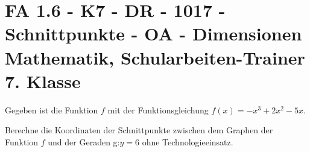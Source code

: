 \section{FA 1.6 - K7 - DR - 1017 - Schnittpunkte - OA - Dimensionen Mathematik, Schularbeiten-Trainer 7. Klasse}

\begin{beispiel}[K7 - DR]{1} %
Gegeben ist die Funktion $f$ mit der Funktionsgleichung $f(x)=-x^3+2x^2-5x$.

Berechne die Koordinaten der Schnittpunkte zwischen dem Graphen der Funktion $f$ und der Geraden g:$y=6$ ohne Technologieeinsatz.\leer

				
				\end{beispiel}